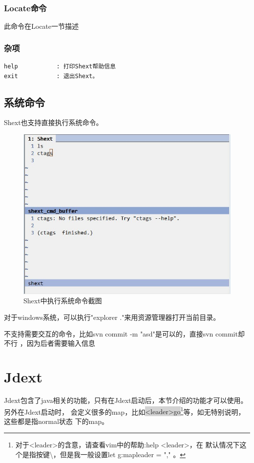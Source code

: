 \documentclass[oneside,openany]{book}
\begin{document}
\subsubsection{Locate命令}
此命令在Locate一节描述

\subsubsection{杂项}
\begin{verbatim}
help           : 打印Shext帮助信息
exit           : 退出Shext。
\end{verbatim}

\subsection{系统命令}
  Shext也支持直接执行系统命令。
  \FloatBarrier
  \begin{figure}[H]%
  \centering
  \includegraphics[scale=0.5]{shext-syscmd.jpg}
  \caption{Shext中执行系统命令截图}
  \end{figure}

  对于windows系统，可以执行"explorer ."来用资源管理器打开当前目录。

  不支持需要交互的命令，比如svn commit -m "asd"是可以的，直接svn commit却不行 ，因为后者需要输入信息

\section{Jdext}
  Jdext包含了java相关的功能，只有在Jdext启动后，本节介绍的功能才可以使用。另外在Jdext启动时，
会定义很多的map，比如\colorbox{lightgray}{<leader>go}\footnote{对于<leader>的含意，请查看vim中的帮助:help <leader>，在
默认情况下这个是指按键\textbackslash，但是我一般设置let g:mapleader = "," 。}等，如无特别说明，这些都是指normal状态
下的map。
\end{document}
